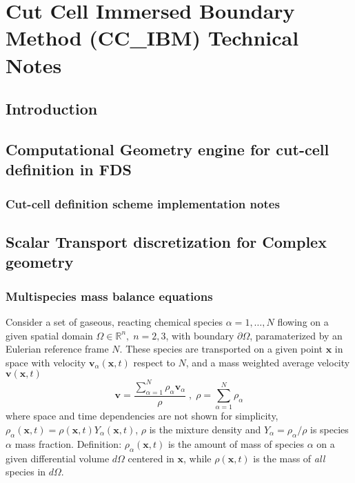\documentclass[12pt]{article}
\begin{document}
\clearpage

\section{Cut Cell Immersed Boundary Method (CC\_IBM) Technical Notes}


\subsection{Introduction}


\subsection{Computational Geometry engine for cut-cell definition in FDS}


\subsubsection{Cut-cell definition scheme implementation notes}


\subsection{Scalar Transport discretization for Complex geometry}


\subsubsection{Multispecies mass balance equations}

Consider a set of gaseous, reacting  chemical species $\alpha=1,\dots,N$ flowing on a given spatial domain $\Omega \in \mathbb{R}^n, \; n=2,3$, with boundary $\partial \Omega$, paramaterized by an Eulerian reference frame $N$. These species are transported on a given point $\mathbf{x}$ in space with velocity $\mathbf{v}_\alpha(\mathbf{x},t)$ respect to $N$, and a mass weighted average velocity $\mathbf{v}(\mathbf{x},t)$
%
\begin{equation}
  \mathbf{v} = \frac{ \sum\limits_{\alpha=1}^{N} {\rho_\alpha \mathbf{v}_\alpha}}{\rho} \; , \; \rho =  \sum\limits_{\alpha=1}^{N} {\rho_\alpha} \label{eq:veldens}
\end{equation}
%
where space and time dependencies are not shown for simplicity, $\rho_\alpha(\mathbf{x},t) = \rho(\mathbf{x},t) Y_\alpha (\mathbf{x},t)$, $\rho$ is the mixture density and $Y_\alpha = \rho_\alpha / \rho$ is species $\alpha$ mass fraction. Definition: $\rho_\alpha(\mathbf{x},t)$ is the amount of mass of species $\alpha$ on a given differential volume $d\Omega$ centered in $\mathbf{x}$, while  $\rho(\mathbf{x},t)$ is the mass of \textit{all} species in $d\Omega$.
\end{document}
